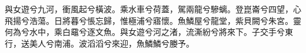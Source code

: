 
\begin{pinyinscope}
與女遊兮九河，衝風起兮橫波。乘水車兮荷蓋，駕兩龍兮驂螭。登崑崙兮四望，心飛揚兮浩蕩。日將暮兮悵忘歸，惟極浦兮寤懷。魚鱗屋兮龍堂，紫貝闕兮朱宮。靈何為兮水中，乘白黿兮逐文魚。與女遊兮河之渚，流澌紛兮將來下。子交手兮東行，送美人兮南浦。波滔滔兮來迎，魚鱗鱗兮媵予。


\end{pinyinscope}